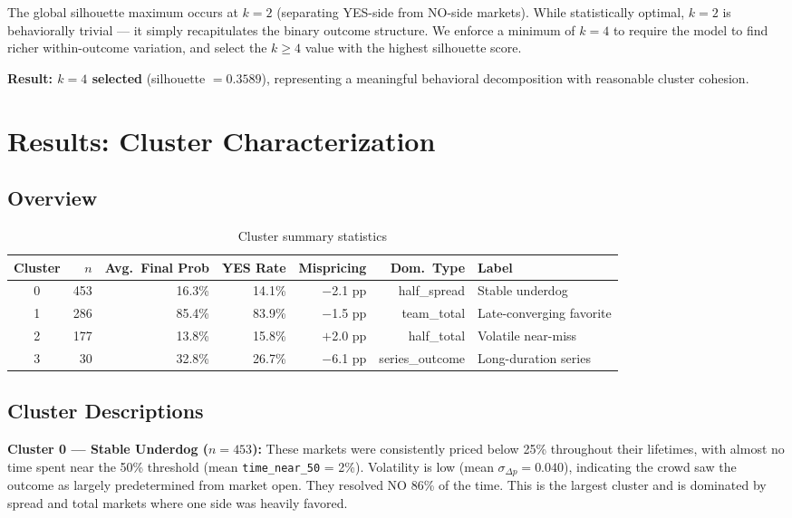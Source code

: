 \documentclass[11pt, a4paper]{article}
\begin{document}
The global silhouette maximum occurs at $k=2$ (separating YES-side from NO-side markets). While statistically optimal, $k=2$ is behaviorally trivial — it simply recapitulates the binary outcome structure. We enforce a minimum of $k=4$ to require the model to find richer within-outcome variation, and select the $k \geq 4$ value with the highest silhouette score.

\textbf{Result: $k=4$ selected} (silhouette $= 0.3589$), representing a meaningful behavioral decomposition with reasonable cluster cohesion.

\section{Results: Cluster Characterization}

\subsection{Overview}

\begin{table}[h!]
\centering
\caption{Cluster summary statistics}
\begin{tabular}{crrrrrl}
\toprule
Cluster & $n$ & Avg.\ Final Prob & YES Rate & Mispricing & Dom.\ Type & Label \\
\midrule
0 & 453 & 16.3\% & 14.1\% & $-$2.1 pp & half\_spread & Stable underdog \\
1 & 286 & 85.4\% & 83.9\% & $-$1.5 pp & team\_total & Late-converging favorite \\
2 & 177 & 13.8\% & 15.8\% & $+$2.0 pp & half\_total & Volatile near-miss \\
3 &  30 & 32.8\% & 26.7\% & $-$6.1 pp & series\_outcome & Long-duration series \\
\bottomrule
\end{tabular}
\end{table}

\subsection{Cluster Descriptions}

\textbf{Cluster 0 --- Stable Underdog ($n=453$):}
These markets were consistently priced below 25\% throughout their lifetimes, with almost no time spent near the 50\% threshold (mean \texttt{time\_near\_50} = 2\%). Volatility is low (mean $\sigma_{\Delta p} = 0.040$), indicating the crowd saw the outcome as largely predetermined from market open. They resolved NO 86\% of the time. This is the largest cluster and is dominated by spread and total markets where one side was heavily favored.
\end{document}
